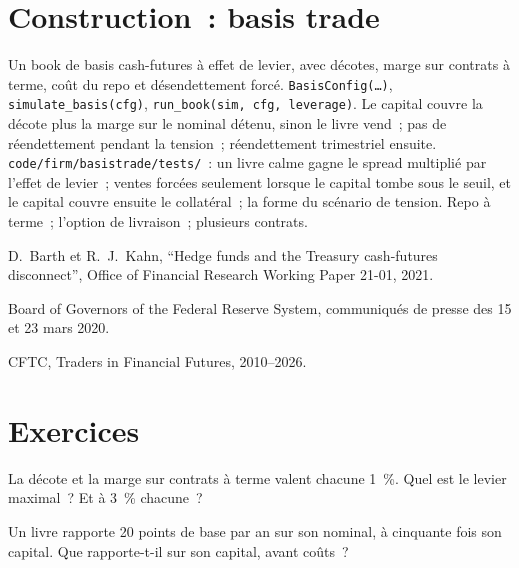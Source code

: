 \section{Construction~: basis trade}\label{bld:s2:the-bond-futures-basis-trade:basistrade}

\begin{build}
 Un book de basis cash-futures à effet de levier, avec décotes, marge sur contrats à terme, coût du repo et désendettement forcé.
 \texttt{BasisConfig(\dots)}, \texttt{simulate\_basis(cfg)}, \texttt{run\_book(sim, cfg, leverage)}.
 Le capital couvre la décote plus la marge sur le nominal détenu, sinon le livre vend~; pas de réendettement pendant la tension~; réendettement trimestriel ensuite.
 \texttt{code/firm/basistrade/tests/}~: un livre calme gagne le spread multiplié par l'effet de levier~; ventes forcées seulement lorsque le capital
tombe sous le seuil, et le capital couvre ensuite le collatéral~; la forme du scénario de tension.
 Repo à terme~; l'option de livraison~; plusieurs contrats.
\end{build}

\begin{omsources}
\item D.~Barth et R.~J.~Kahn, ``Hedge funds and the Treasury cash-futures disconnect'', Office of Financial Research Working Paper 21-01, 2021.
\item Board of Governors of the Federal Reserve System, communiqués de presse des 15 et 23 mars 2020.
\item CFTC, Traders in Financial Futures, 2010--2026.
\end{omsources}

\section{Exercices}

\begin{exercise}[$\star$]\label{exo:s2:the-bond-futures-basis-trade:1}
La décote et la marge sur contrats à terme valent chacune 1~\%. Quel est le levier maximal~? Et à 3~\% chacune~?
\end{exercise}

\begin{exercise}[$\star$]\label{exo:s2:the-bond-futures-basis-trade:2}
Un livre rapporte 20 points de base par an sur son nominal, à cinquante fois son capital. Que rapporte-t-il sur son capital, avant coûts~?
\end{exercise}

